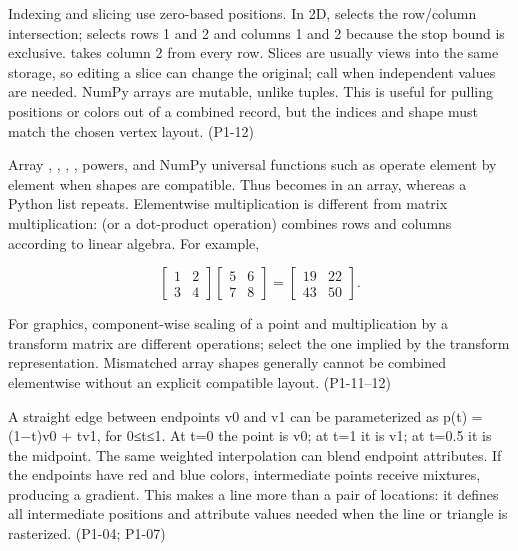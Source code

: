 Indexing and slicing use zero-based positions. In 2D,  selects the row/column intersection;  selects rows 1 and 2 and columns 1 and 2 because the stop bound is exclusive.  takes column 2 from every row. Slices are usually views into the same storage, so editing a slice can change the original; call  when independent values are needed. NumPy arrays are mutable, unlike tuples. This is useful for pulling positions or colors out of a combined record, but the indices and shape must match the chosen vertex layout. (P1-12)

Array \BookInlineCode{{+}}{+}, \BookInlineCode{{-}}{-}, \BookInlineCode{{*}}{*}, \BookInlineCode{{/}}{/}, powers, and NumPy universal functions such as  operate element by element when shapes are compatible. Thus  becomes \BookInlineCode{{{[}}{2}{,}{4}{,}{6}{{]}}}{{[}2,4,6{]}} in an array, whereas a Python list repeats. Elementwise multiplication is different from matrix multiplication:  (or a dot-product operation) combines rows and columns according to linear algebra. For example,

\[
\begin{bmatrix}1&2\\3&4\end{bmatrix}
\begin{bmatrix}5&6\\7&8\end{bmatrix}
=
\begin{bmatrix}19&22\\43&50\end{bmatrix}.
\]

For graphics, component-wise scaling of a point and multiplication by a transform matrix are different operations; select the one implied by the transform representation. Mismatched array shapes generally cannot be combined elementwise without an explicit compatible layout. (P1-11--12)

A straight edge between endpoints v0 and v1 can be parameterized as p(t) = (1−t)v0 + tv1, for 0≤t≤1. At t=0 the point is v0; at t=1 it is v1; at t=0.5 it is the midpoint. The same weighted interpolation can blend endpoint attributes. If the endpoints have red and blue colors, intermediate points receive mixtures, producing a gradient. This makes a line more than a pair of locations: it defines all intermediate positions and attribute values needed when the line or triangle is rasterized. (P1-04; P1-07)

